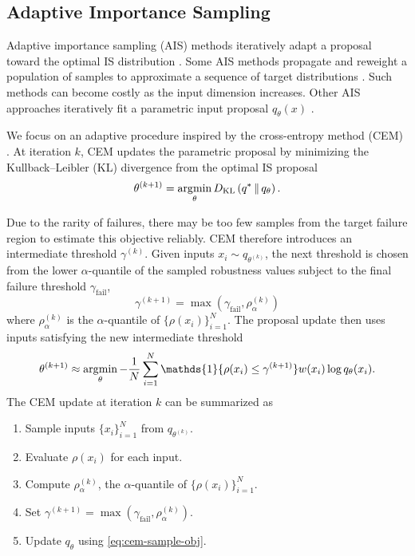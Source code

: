 \documentclass[twoside,11pt]{article}
\begin{document}
\subsection{Adaptive Importance Sampling}

Adaptive importance sampling (AIS) methods iteratively adapt a proposal toward the optimal IS distribution \citep{bugallo2017adaptive}. Some AIS methods propagate and reweight a population of samples to approximate a sequence of target distributions \citep{cappe2004population, martino2017layered, elvira2017improving}. Such methods can become costly as the input dimension increases. Other AIS approaches iteratively fit a parametric input proposal $q_{\theta}(x)$ \citep{rubinstein2004cross, cornuet2012adaptive}.

We focus on an adaptive procedure inspired by the cross-entropy method (CEM) \citep{rubinstein2004cross}. At iteration $k$, CEM updates the parametric proposal by minimizing the Kullback--Leibler (KL) divergence from the optimal IS proposal
\begin{equation*}
    \theta^{(k+1)}
    =
    \operatorname*{\arg\!\min}_{\theta}
    D_{\mathrm{KL}}
    \left(
        q^*
        \,\|\,
        q_{\theta}
    \right).
\end{equation*}

Due to the rarity of failures, there may be too few samples from the target failure region to estimate this objective reliably. CEM therefore introduces an intermediate threshold $\gamma^{(k)}$. Given inputs $x_i\sim q_{\theta^{(k)}}$, the next threshold is chosen from the lower $\alpha$-quantile of the sampled robustness values subject to the final failure threshold $\gamma_{\text{fail}}$,
\begin{equation*}
    \gamma^{(k+1)}
    =
    \max
    \left(
        \gamma_{\text{fail}},
        \rho_{\alpha}^{(k)}
    \right)
\end{equation*}
where $\rho_{\alpha}^{(k)}$ is the $\alpha$-quantile of $\{\rho(x_i)\}_{i=1}^N$. The proposal update then uses inputs satisfying the new intermediate threshold
\begin{equation}
\label{eq:cem-sample-obj}
    \theta^{(k+1)}
    \approx
    \argmin_{\theta}
    -\frac{1}{N}
    \sum_{i=1}^N
    \mathds{1}\{\rho(x_i)\leq\gamma^{(k+1)}\}
    w(x_i)
    \log q_{\theta}(x_i).
\end{equation}
The CEM update at iteration $k$ can be summarized as
\begin{enumerate}
    \item Sample inputs $\{x_i\}_{i=1}^N$ from $q_{\theta^{(k)}}$.
    \item Evaluate $\rho(x_i)$ for each input.
    \item Compute $\rho_{\alpha}^{(k)}$, the $\alpha$-quantile of $\{\rho(x_i)\}_{i=1}^N$.
    \item Set $\gamma^{(k+1)} = \max(\gamma_{\text{fail}}, \rho_{\alpha}^{(k)})$.
    \item Update $q_{\theta}$ using \cref{eq:cem-sample-obj}.
\end{enumerate}
\end{document}
